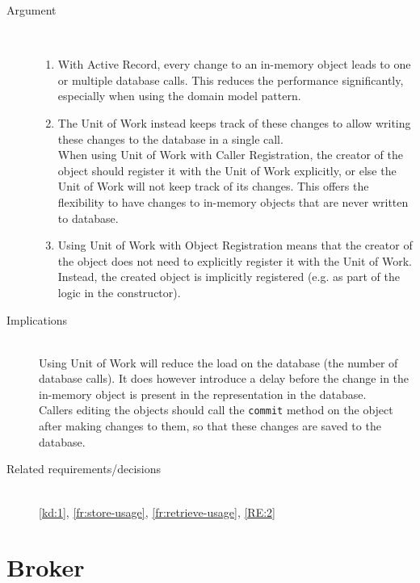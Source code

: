 \begin{description}
\item [Argument]~\\
\begin{enumerate}
\item With Active Record, every change to an in-memory object leads to one or multiple database calls. This reduces the performance significantly, especially when using the domain model pattern.

\item The Unit of Work instead keeps track of these changes to allow writing these changes to the database in a single call.\\ When using Unit of Work with Caller Registration, the creator of the object should register it with the Unit of Work explicitly, or else the Unit of Work will not keep track of its changes. This offers the flexibility to have changes to in-memory objects that are never written to database. 

\item Using Unit of Work with Object Registration means that the creator of the object does not need to explicitly register it with the Unit of Work. Instead, the created object is implicitly registered (e.g. as part of the logic in the constructor). 
\end{enumerate}

\item [Implications]~\\
Using Unit of Work will reduce the load on the database (the number of database calls). It does however introduce a delay before the change in the in-memory object is present in the representation in the database. \\
Callers editing the objects should call the \verb|commit| method on the object after making changes to them, so that these changes are saved to the database.

\item [Related requirements/decisions]~\\
\ref{kd:1}, \ref{fr:store-usage}, \ref{fr:retrieve-usage}, \ref{RE:2}

\end{description}

\section{Broker}

